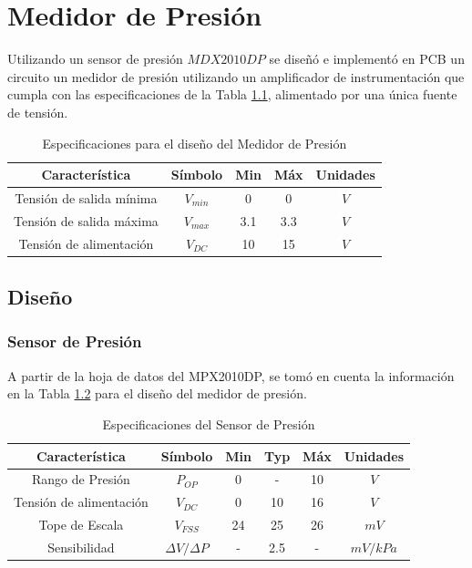 \chapter{Medidor de Presión}
Utilizando un sensor de presión $MDX2010DP$ se diseñó e implementó en PCB un circuito un medidor de presión utilizando un amplificador de instrumentación que cumpla con las especificaciones de la Tabla \ref{e4:tab_specs}, alimentado por una única fuente de tensión.

\begin{table}[ht]
\begin{center}
\begin{tabular}{||c|c||c|c|c||}
\hline
Característica				&Símbolo	&Min	&Máx	&Unidades \\
\hline
Tensión de salida mínima	&$V_{min}$	&0		&0		&$V$ \\
Tensión de salida máxima	&$V_{max}$	&3.1	&3.3	&$V$ \\
Tensión de alimentación		&$V_{DC}$	&10		&15		&$V$ \\
\hline
\end{tabular}
\caption{Especificaciones para el diseño del Medidor de Presión}
\label{e4:tab_specs}
\end{center}
\end{table}

\section{Diseño}
\subsection{Sensor de Presión}
A partir de la hoja de datos del MPX2010DP, se tomó en cuenta la información en la Tabla \ref{e4:tab_sensor_specs} para el diseño del medidor de presión.

\begin{table}[ht]
\begin{center}
\begin{tabular}{||c|c||c|c|c|c||}
\hline
Característica				&Símbolo	&Min	&Typ	&Máx	&Unidades \\
\hline
Rango de Presión			&$P_{OP}$	&0		&-		&10		&$V$ \\
Tensión de alimentación		&$V_{DC}$	&0		&10		&16		&$V$ \\
Tope de Escala				&$V_{FSS}$	&24		&25		&26		&$mV$ \\
Sensibilidad				&$\Delta V / \Delta P$ &-&2.5	&-	&$mV/kPa$\\
\hline
\end{tabular}
\caption{Especificaciones del Sensor de Presión}
\label{e4:tab_sensor_specs}
\end{center}
\end{table}


